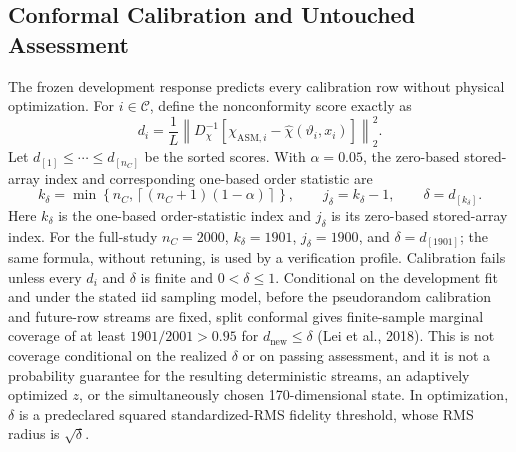 \documentclass[a4paper,fleqn]{cas-sc}
\begin{document}
\subsection{Conformal Calibration and Untouched Assessment}

The frozen development response predicts every calibration row without physical optimization. For $i\in\mathcal C$, define the nonconformity score exactly as
\begin{equation}
\label{eq:conformal_score}
d_i=\frac1L\left\|D_\chi^{-1}
\left[\chi_{\mathrm{ASM},i}-\widehat\chi(\vartheta_i,x_i)\right]\right\|_2^2.
\end{equation}
Let $d_{[1]}\leq\cdots\leq d_{[n_C]}$ be the sorted scores. With $\alpha=0.05$, the zero-based stored-array index and corresponding one-based order statistic are
\begin{equation}
\label{eq:conformal_radius}
k_\delta=\min\!\left\{n_C,\left\lceil(n_C+1)(1-\alpha)\right\rceil\right\},
\qquad j_\delta=k_\delta-1,\qquad \delta=d_{[k_\delta]}.
\end{equation}
Here $k_\delta$ is the one-based order-statistic index and $j_\delta$ is its zero-based stored-array index. For the full-study $n_C=2000$, $k_\delta=1901$, $j_\delta=1900$, and $\delta=d_{[1901]}$; the same formula, without retuning, is used by a verification profile.
Calibration fails unless every $d_i$ and $\delta$ is finite and $0<\delta\leq1$. Conditional on the development fit and under the stated iid sampling model, before the pseudorandom calibration and future-row streams are fixed, split conformal gives finite-sample marginal coverage of at least $1901/2001>0.95$ for $d_{\mathrm{new}}\leq\delta$ (Lei et al., 2018). This is not coverage conditional on the realized $\delta$ or on passing assessment, and it is not a probability guarantee for the resulting deterministic streams, an adaptively optimized $z$, or the simultaneously chosen 170-dimensional state. In optimization, $\delta$ is a predeclared squared standardized-RMS fidelity threshold, whose RMS radius is $\sqrt{\delta}$.
\end{document}
